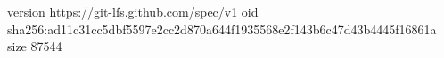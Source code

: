 version https://git-lfs.github.com/spec/v1
oid sha256:ad11c31cc5dbf5597e2cc2d870a644f1935568e2f143b6c47d43b4445f16861a
size 87544
